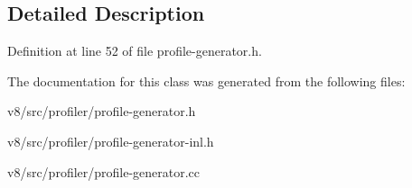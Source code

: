 \subsection{Detailed Description}


Definition at line 52 of file profile-\/generator.\+h.



The documentation for this class was generated from the following files\+:\begin{DoxyCompactItemize}
\item 
v8/src/profiler/profile-\/generator.\+h\item 
v8/src/profiler/profile-\/generator-\/inl.\+h\item 
v8/src/profiler/profile-\/generator.\+cc\end{DoxyCompactItemize}
